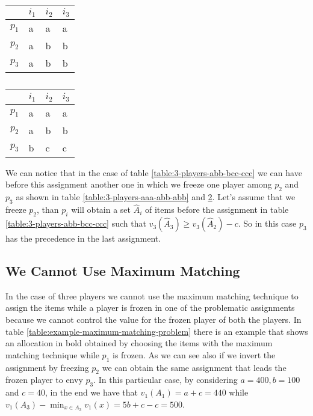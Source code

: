 \documentclass{article}
\begin{document}
\begin{table}[!htb]
    \begin{minipage}{.5\linewidth}
      \centering
        \begin{tabular}{|l|l|l|l|}
        \hline
              & $i_1$ & $i_2$ & $i_3$ \\ \hline
        $p_1$ & a     & a     & a     \\ \hline
        $p_2$ & a     & b     & b     \\ \hline
        $p_3$ & a     & b     & b     \\ \hline
        \end{tabular}
        \caption{}
        \label{table:3-players-aaa-abb-abb}
    \end{minipage}%
    \begin{minipage}{.5\linewidth}
      \centering
        \begin{tabular}{|l|l|l|l|}
        \hline
              & $i_1$ & $i_2$ & $i_3$ \\ \hline
        $p_1$ & a     & a     & a     \\ \hline
        $p_2$ & a     & b     & b     \\ \hline
        $p_3$ & b     & c     & c     \\ \hline
        \end{tabular}
        \caption{}
        \label{table:3-players-aaa-abb-bcc}
    \end{minipage}%

\end{table}

We can notice that in the case of table \ref{table:3-players-abb-bcc-ccc} we can have before this assignment another one in which we freeze one player among $p_2$ and $p_3$ as shown in table \ref{table:3-players-aaa-abb-abb} and \ref{table:3-players-aaa-abb-bcc}. Let's assume that we freeze $p_2$, than $p_i$ will obtain a set $\hat A_i$ of items before the assignment in table \ref{table:3-players-abb-bcc-ccc} such that $v_3(\hat A_3) \ge v_3(\hat A_2) - c$. So in this case $p_3$ has the precedence in the last assignment.

\subsection{We Cannot Use Maximum Matching}
In the case of three players we cannot use the maximum matching technique to assign the items while a player is frozen in one of the problematic assignments because we cannot control the value for the frozen player of both the players. In table \ref{table:example-maximum-matching-problem} there is an example that shows an allocation in bold obtained by choosing the items with the maximum matching technique while $p_1$ is frozen. As we can see also if we invert the assignment by freezing $p_2$ we can obtain the same assignment that leads the frozen player to envy $p_3$. In this particular case, by considering $a=400, b=100$ and $c=40$, in the end we have that $v_1(A_1) = a + c = 440$ while $v_1(A_3) - \min_{x \in A_3} v_1(x) = 5b + c -c = 500$. 
\end{document}
